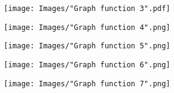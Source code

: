 \documentclass[nooutcomes]{ximera}
\renewenvironment{freeResponse}{
\ifhandout\setbox0\vbox\bgroup\else
\begin{trivlist}\item[\hskip \labelsep\bfseries Solution:\hspace{2ex}]
\fi}
{\ifhandout\egroup\else
\end{trivlist}
\fi}
\begin{document}
\begin{problem}
\begin{freeResponse}
    \begin{image}
      \texttt{[image: Images/"Graph function 3".pdf]}
    \end{image}

    \begin{image}
      \texttt{[image: Images/"Graph function 4".png]}
    \end{image}

    \begin{image}
      \texttt{[image: Images/"Graph function 5".png]}
    \end{image}

    \begin{image}
      \texttt{[image: Images/"Graph function 6".png]}
    \end{image}

    \begin{image}
      \texttt{[image: Images/"Graph function 7".png]}
    \end{image}
  \end{freeResponse}
\end{problem}
\end{document}

